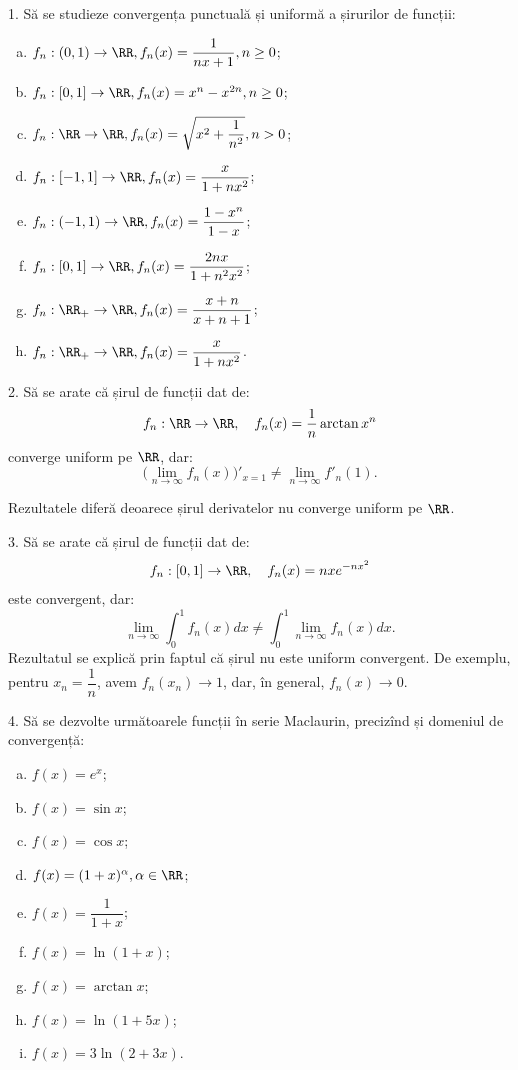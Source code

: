 1. Să se studieze convergența punctuală și uniformă a șirurilor de funcții:
\begin{enumerate}[(a)]
\item $ f_n : (0, 1) \to \RR, f_n(x) = \dfrac{1}{nx + 1}, n \geq 0 $;
\item $ f_n : [0, 1] \to \RR, f_n(x) = x^n - x^{2n}, n \geq 0 $;
\item $ f_n : \RR \to \RR, f_n(x) = \sqrt{x^2 + \dfrac{1}{n^2}}, n > 0 $;
\item $ f_n : [-1,1] \to \RR, f_n(x) = \dfrac{x}{1 + nx^2} $;
\item $ f_n : (-1, 1) \to \RR, f_n(x) = \dfrac{1 - x^n}{1 - x} $;
\item $ f_n : [0, 1] \to \RR, f_n(x) = \dfrac{2nx}{1 + n^2 x^2} $;
\item $ f_n : \RR_+ \to \RR, f_n(x) = \dfrac{x + n}{x + n + 1} $;
\item $ f_n : \RR_+ \to \RR, f_n(x) = \dfrac{x}{1 + nx^2} $.
\end{enumerate}

\vspace{1cm}

2. Să se arate că șirul de funcții dat de:
\[
  f_n : \RR \to \RR, \quad f_n(x) = \frac{1}{n} \arctan x^n
\]
converge uniform pe $ \RR $, dar:
\[
  \Big( \lim_{n \to \infty} f_n(x) \Big)'_{x = 1} \neq \lim_{n \to \infty} f'_n(1).
\]

Rezultatele diferă deoarece șirul derivatelor nu converge uniform pe $ \RR $.

\vspace{1cm}

3. Să se arate că șirul de funcții dat de:
\[
  f_n : [0, 1] \to \RR, \quad f_n(x) = nxe^{-nx^2}
\]
este convergent, dar:
\[
  \lim_{n \to \infty} \int_0^1 f_n(x) dx \neq \int_0^1 \lim_{n \to \infty} f_n(x) dx.
\]
Rezultatul se explică prin faptul că șirul nu este uniform convergent.
De exemplu, pentru $ x_n = \dfrac{1}{n} $, avem $ f_n(x_n) \to 1 $, dar,
în general, $ f_n(x) \to 0 $.

\vspace{1cm}

4. Să se dezvolte următoarele funcții în serie Maclaurin, precizînd și
domeniul de convergență:
\begin{enumerate}[(a)]
\item $ f(x) = e^x $;
\item $ f(x) = \sin x $;
\item $ f(x) = \cos x $;
\item $ f(x) = (1 + x)^\alpha, \alpha \in \RR $;
\item $ f(x) = \dfrac{1}{1 + x} $;
\item $ f(x) = \ln(1 + x) $;
\item $ f(x) = \arctan x $;
\item $ f(x) = \ln(1 + 5x)$;
\item $ f(x) = 3 \ln(2 + 3x) $.
\end{enumerate}

